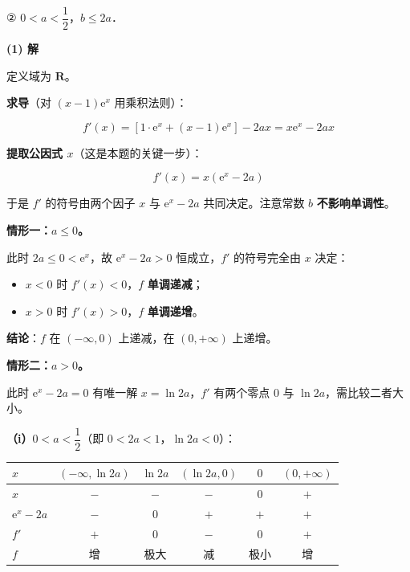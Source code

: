   ② $0<a<\dfrac12$，$b\le2a$．

\par\medskip

\textbf{(1) 解}

定义域为 $\mathbf R$。

\textbf{求导}（对 $(x-1)\mathrm e^{x}$ 用乘积法则）：

\[f'(x)=\left[1\cdot\mathrm e^{x}+(x-1)\mathrm e^{x}\right]-2ax=x\mathrm e^{x}-2ax\]

\textbf{提取公因式 $x$}（这是本题的关键一步）：

\[\boxed{\ f'(x)=x\left(\mathrm e^{x}-2a\right)\ }\]

于是 $f'$ 的符号由两个因子 $x$ 与 $\mathrm e^{x}-2a$ 共同决定。注意常数 $b$ \textbf{不影响单调性}。

\par\medskip

\textbf{情形一：$a\le0$。}

此时 $2a\le0<\mathrm e^{x}$，故 $\mathrm e^{x}-2a>0$ 恒成立，$f'$ 的符号完全由 $x$ 决定：

\begin{itemize}
\item $x<0$ 时 $f'(x)<0$，$f$ \textbf{单调递减}；
\item $x>0$ 时 $f'(x)>0$，$f$ \textbf{单调递增}。
\end{itemize}

\textbf{结论}：$f$ 在 $(-\infty,0)$ 上递减，在 $(0,+\infty)$ 上递增。

\par\medskip

\textbf{情形二：$a>0$。}

此时 $\mathrm e^{x}-2a=0$ 有唯一解 $x=\ln2a$，$f'$ 有两个零点 $0$ 与 $\ln2a$，需比较二者大小。

\textbf{（i）$0<a<\dfrac12$}（即 $0<2a<1$，$\ln2a<0$）：

\begin{center}
\begin{tabular}{lccccc}
\toprule
$x$ & $(-\infty,\ln2a)$ & $\ln2a$ & $(\ln2a,0)$ & $0$ & $(0,+\infty)$ \\
\midrule
$x$ & $-$ & $-$ & $-$ & $0$ & $+$ \\
$\mathrm e^{x}-2a$ & $-$ & $0$ & $+$ & $+$ & $+$ \\
$f'$ & $+$ & $0$ & $-$ & $0$ & $+$ \\
$f$ & 增 & 极大 & 减 & 极小 & 增 \\
\bottomrule
\end{tabular}
\end{center}

